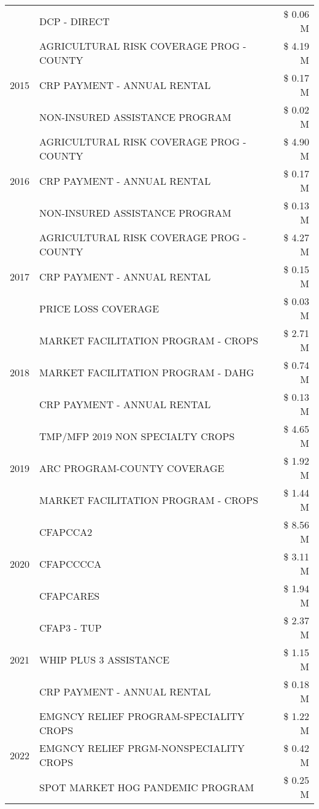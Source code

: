 \begin{tabular}{llr}
 & DCP - DIRECT & \$ 0.06 M \\
\cline{1-3}
\multirow[t]{3}{*}{2015} & AGRICULTURAL RISK COVERAGE PROG - COUNTY & \$ 4.19 M \\
 & CRP PAYMENT - ANNUAL RENTAL & \$ 0.17 M \\
 & NON-INSURED ASSISTANCE PROGRAM & \$ 0.02 M \\
\cline{1-3}
\multirow[t]{3}{*}{2016} & AGRICULTURAL RISK COVERAGE PROG - COUNTY & \$ 4.90 M \\
 & CRP PAYMENT - ANNUAL RENTAL & \$ 0.17 M \\
 & NON-INSURED ASSISTANCE PROGRAM & \$ 0.13 M \\
\cline{1-3}
\multirow[t]{3}{*}{2017} & AGRICULTURAL RISK COVERAGE PROG - COUNTY & \$ 4.27 M \\
 & CRP PAYMENT - ANNUAL RENTAL & \$ 0.15 M \\
 & PRICE LOSS COVERAGE & \$ 0.03 M \\
\cline{1-3}
\multirow[t]{3}{*}{2018} & MARKET FACILITATION PROGRAM - CROPS & \$ 2.71 M \\
 & MARKET FACILITATION PROGRAM - DAHG & \$ 0.74 M \\
 & CRP PAYMENT - ANNUAL RENTAL & \$ 0.13 M \\
\cline{1-3}
\multirow[t]{3}{*}{2019} & TMP/MFP 2019 NON SPECIALTY CROPS & \$ 4.65 M \\
 & ARC PROGRAM-COUNTY COVERAGE & \$ 1.92 M \\
 & MARKET FACILITATION PROGRAM - CROPS & \$ 1.44 M \\
\cline{1-3}
\multirow[t]{3}{*}{2020} & CFAPCCA2 & \$ 8.56 M \\
 & CFAPCCCCA & \$ 3.11 M \\
 & CFAPCARES & \$ 1.94 M \\
\cline{1-3}
\multirow[t]{3}{*}{2021} & CFAP3 - TUP & \$ 2.37 M \\
 & WHIP PLUS 3 ASSISTANCE & \$ 1.15 M \\
 & CRP PAYMENT - ANNUAL RENTAL & \$ 0.18 M \\
\cline{1-3}
\multirow[t]{3}{*}{2022} & EMGNCY RELIEF PROGRAM-SPECIALITY CROPS & \$ 1.22 M \\
 & EMGNCY RELIEF PRGM-NONSPECIALITY CROPS & \$ 0.42 M \\
 & SPOT MARKET HOG PANDEMIC PROGRAM & \$ 0.25 M \\
\cline{1-3}
\bottomrule
\end{tabular}
